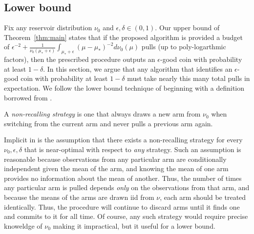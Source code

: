 \subsection{Lower bound}

Fix any reservoir distribution $\nu_0$ and $\epsilon,\delta \in (0,1)$. 
Our upper bound of Theorem~\ref{thm:main} states that if the proposed algorithm is provided a budget of $\epsilon^{-2}+\frac{1}{\nu_0(\mu_* + \epsilon)}\int_{\mu_*+\epsilon} (\mu-\mu_*)^{-2} d\nu_0(\mu)$ pulls (up to poly-logarthmic factors), then the prescribed procedure outputs an $\epsilon$-good coin with probability at least $1-\delta$.
In this section, we argue that any algorithm that identifies an $\epsilon$-good coin with probability at least $1-\delta$ must take nearly this many total pulls in expectation.
We follow the lower bound technique of \cite{malloy2012quickest} beginning with a definition borrowed from \cite{berry1997}.
\begin{definition}
A \emph{non-recalling strategy} is one that always draws a new arm from $\nu_0$ when switching from the current arm and never pulls a previous arm again.
\end{definition}

Implicit in \cite{malloy2012quickest} is the assumption that there exists a non-recalling strategy for every $\nu_0, \epsilon, \delta$ that is near-optimal with respect to \emph{any} strategy.
Such an assumption is reasonable because observations from any particular arm are conditionally independent given the mean of the arm, and knowing the mean of one arm provides no information about the mean of another. 
Thus, the number of times any particular arm is pulled depends \emph{only} on the observations from that arm, and because the means of the arms are drawn iid from $\nu$, each arm should be treated identically.
Thus, the procedure will continue to discard arms until it finds one and commits to it for all time. 
Of course, any such strategy would require precise knoweldge of $\nu_0$ making it impractical, but it useful for a lower bound.


